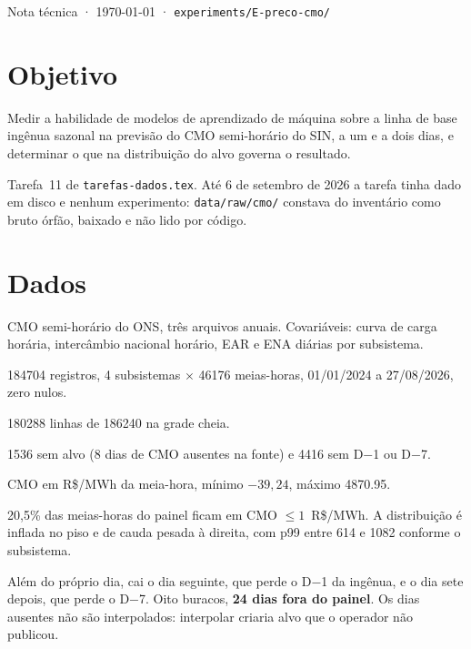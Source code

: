 \documentclass[10pt,a4paper,oneside,twocolumn]{book}
\begin{document}
         {Nota técnica · \today{} ·
          \texttt{experiments/E-preco-cmo/}}

\section*{Objetivo}

Medir a habilidade de modelos de aprendizado de máquina sobre a linha de base
ingênua sazonal na previsão do CMO semi-horário do SIN, a um e a dois dias, e
determinar o que na distribuição do alvo governa o resultado.

Tarefa~11 de \texttt{tarefas-dados.tex}. Até 6 de setembro de 2026 a tarefa
tinha dado em disco e nenhum experimento: \texttt{data/raw/cmo/} constava do
inventário como bruto órfão, baixado e não lido por código.

\section*{Dados}

CMO semi-horário do ONS, três arquivos anuais. Covariáveis: curva de carga
horária, intercâmbio nacional horário, EAR e ENA diárias por subsistema.

\begin{ficha}
  \item[Fonte]     \num{184704} registros, 4 subsistemas $\times$ \num{46176}
                   meias-horas, 01/01/2024 a 27/08/2026, zero nulos.
  \item[Painel]    \num{180288} linhas de \num{186240} na grade cheia.
  \item[Descartes] \num{1536} sem alvo (8 dias de CMO ausentes na fonte) e
                   \num{4416} sem D$-$1 ou D$-$7.
  \item[Alvo]      CMO em R\$/MWh da meia-hora, mínimo $-39{,}24$,
                   máximo \num{4870.95}.
\end{ficha}

 20,5\% das meias-horas do painel ficam em CMO
$\leq 1$~R\$/MWh. A distribuição é inflada no piso e de cauda pesada à direita,
com p99 entre 614 e \num{1082} conforme o subsistema.

 Além do próprio dia, cai
o dia seguinte, que perde o D$-$1 da ingênua, e o dia sete depois, que perde o
D$-$7. Oito buracos, \textbf{24 dias fora do painel}. Os dias ausentes não são
interpolados: interpolar criaria alvo que o operador não publicou.
\end{document}
